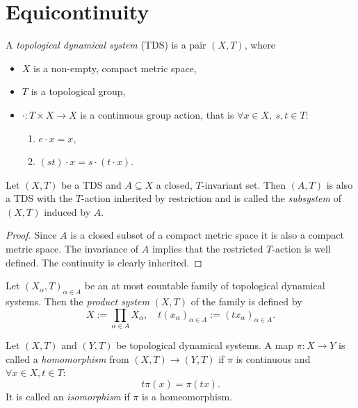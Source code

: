 \section{Equicontinuity}

\begin{definition}
	A \emph{topological dynamical system} (TDS) is a pair $(X, T)$, where
	\begin{itemize}
		\item $X$ is a non-empty, compact metric space,
		\item $T$ is a topological group,
		\item $\cdot : T \times  X \to X$ is a continuous group action, that is $\forall x \in X, \ s,t \in T$: 
		\begin{enumerate}
			\item $ e \cdot x = x$,
			\item $(st)\cdot x = s \cdot (t \cdot x)$.
		\end{enumerate}
	\end{itemize}
\end{definition}

\begin{proposition}[Subsystem]
	Let $(X, T)$ be a TDS and $A \subseteq X$ a closed, $T$-invariant set.
	Then $(A, T)$ is also a TDS with the $T$-action inherited by restriction and is called the \emph{subsystem} of $(X, T)$ induced by $A$.
\end{proposition}
\begin{proof}
	Since $A$ is a closed subset of a compact metric space it is also a compact metric space.
	The invariance of $A$ implies that the restricted $T$-action is well defined.
	The continuity is clearly inherited.
\end{proof}

\begin{definition}
	Let $(X_\alpha, T)_{\alpha \in A}$ be an at most countable family of topological dynamical systems. Then the \emph{product system} $(X, T)$ of the family is defined by
	\begin{equation*}
		X := \prod_{\alpha \in A} X_\alpha, \quad t (x_\alpha)_{\alpha \in A} := (t x_\alpha)_{\alpha \in A}.
	\end{equation*}
\end{definition}

\begin{definition}
	Let $(X, T)$ and $(Y,T)$ be topological dynamical systems.
	A map $\pi : X \to Y$ is called a \emph{homomorphism} from $(X, T) \to (Y, T)$ if $\pi$ is continuous and $\forall x \in X, t \in T$:
	\begin{equation*}
		t \pi (x) = \pi(tx).
	\end{equation*}
	It is called an \emph{isomorphism} if $\pi$ is a homeomorphism.
\end{definition}


